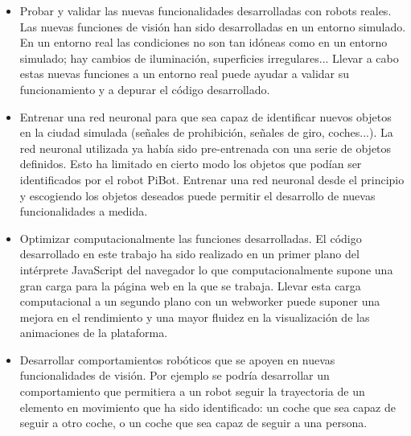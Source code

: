 \documentclass{report}
\begin{document}
\begin{itemize}
\item Probar y validar las nuevas funcionalidades desarrolladas con robots reales. Las nuevas funciones de visión han sido desarrolladas en un entorno simulado. En un entorno real las condiciones no son tan idóneas como en un entorno simulado; hay cambios de iluminación, superficies irregulares... Llevar a cabo estas nuevas funciones a un entorno real puede ayudar a validar su funcionamiento y a depurar el código desarrollado.

\item Entrenar una red neuronal para que sea capaz de identificar nuevos objetos en la ciudad simulada (señales de prohibición, señales de giro, coches...). La red neuronal utilizada ya había sido pre-entrenada con una serie de objetos definidos. Esto ha limitado en cierto modo los objetos que podían ser identificados por el robot PiBot. Entrenar una red neuronal desde el principio y escogiendo los objetos deseados puede permitir el desarrollo de nuevas funcionalidades a medida.

\newpage
\item Optimizar computacionalmente las funciones desarrolladas. El código desarrollado en este trabajo ha sido realizado en un primer plano del intérprete JavaScript del navegador lo que computacionalmente supone una gran carga para la página web en la que se trabaja. Llevar esta carga computacional a un segundo plano con un webworker puede suponer una mejora en el rendimiento y una mayor fluidez en la visualización de las animaciones de la plataforma. 

\item Desarrollar comportamientos robóticos que se apoyen en nuevas funcionalidades de visión. Por ejemplo se podría desarrollar un comportamiento que permitiera a un robot seguir la trayectoria de un elemento en movimiento que ha sido identificado: un coche que sea capaz de seguir a otro coche, o un coche que sea capaz de seguir a una persona.
\end{itemize}
\end{document}

